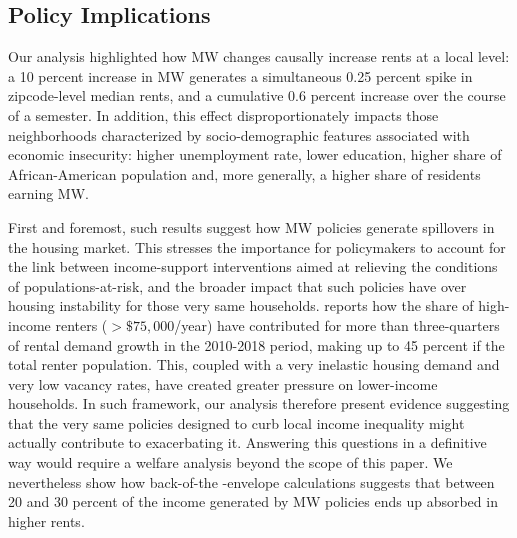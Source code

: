 \subsection{Policy Implications}\label{sec:policy}

Our analysis highlighted how MW changes causally increase rents at a local level: a 10 percent
increase in MW generates a simultaneous 0.25 percent spike in zipcode-level median rents, and 
a cumulative 0.6 percent increase over the course of a semester. In addition, this effect 
disproportionately impacts those neighborhoods characterized by socio-demographic
features associated with economic insecurity: higher unemployment rate, lower education, 
higher share of African-American population and, more generally, a higher share of residents 
earning MW. 

First and foremost, such results suggest how MW policies generate spillovers in the housing market. 
This stresses the importance for policymakers to account for the link between 
income-support interventions aimed at relieving the conditions of populations-at-risk, 
and the broader impact that such policies have over housing instability for those very same households.
\textcite{fernald2020americas} reports how the share of high-income renters ($>\$75,000$/year) have contributed for more
than three-quarters of rental demand growth in the 2010-2018 period, making up to 45 percent 
if the total renter population. This, coupled with a very inelastic housing demand and very low 
vacancy rates, have created greater pressure on lower-income households. In such framework, our analysis 
therefore present evidence suggesting that the very same policies designed to curb local income inequality
might actually contribute to exacerbating it. Answering this questions in a definitive way 
would require a welfare analysis beyond the scope of this paper. We nevertheless show how back-of-the
-envelope calculations suggests that between 20 and 30 percent of the income generated by MW policies 
ends up absorbed in higher rents.

